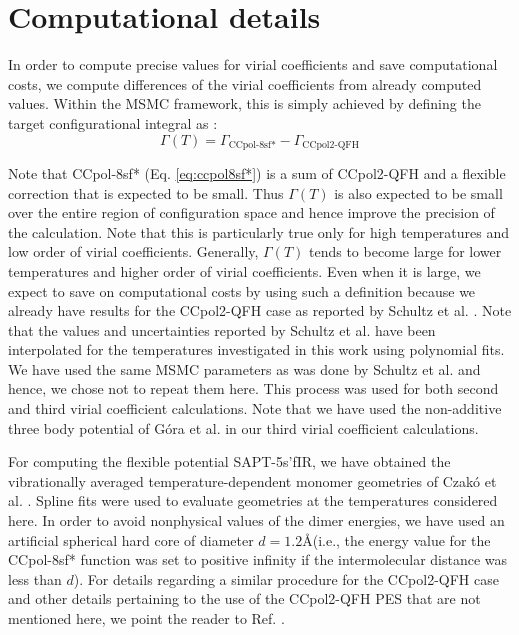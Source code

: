 \section{Computational details}
    \label{sec:computational details}
        In order to compute precise values for virial coefficients and save computational costs, we compute differences of the virial coefficients from already computed values. Within the MSMC framework, this is simply achieved by defining the target configurational integral as \cite{Shaul2012}:
        \begin{equation}
            \Gamma (T) = \Gamma_{\text{CCpol-8sf*}} - \Gamma_{\text{CCpol2-QFH}}
        \end{equation}

        Note that CCpol-8sf* (Eq. \eqref{eq:ccpol8sf*}) is a sum of CCpol2-QFH and a flexible correction that is expected to be small. Thus $\Gamma (T)$ is also expected to be small over the entire region of configuration space and hence improve the precision of the calculation. Note that this is particularly true only for high temperatures and low order of virial coefficients. Generally, $\Gamma (T)$ tends to become large for lower temperatures and higher order of virial coefficients. Even when it is large, we expect to save on computational costs by using such a definition because we already have results for the CCpol2-QFH case as reported by Schultz et al. \cite{Schultz2015}. Note that the values and uncertainties reported by Schultz et al. have been interpolated for the temperatures investigated in this work using polynomial fits. We have used the same MSMC parameters as was done by Schultz et al. and hence, we chose not to repeat them here. This process was used for both second and third virial coefficient calculations. Note that we have used the non-additive three body potential of G\'{o}ra et al. \cite{Gora2014} in our third virial coefficient calculations.

        For computing the flexible potential SAPT-5s'fIR, we have obtained the vibrationally averaged temperature-dependent monomer geometries of Czak\'{o} et al. \cite{Czako2009}. Spline fits were used to evaluate geometries at the temperatures considered here. In order to avoid nonphysical values of the dimer energies, we have used an artificial spherical hard core of diameter $d = 1.2$\AA (i.e., the energy value for the CCpol-8sf* function was set to positive infinity if the intermolecular distance was less than $d$). For details regarding a similar procedure for the CCpol2-QFH case and other details pertaining to the use of the CCpol2-QFH PES that are not mentioned here, we point the reader to Ref. \cite{Schultz2015}.

